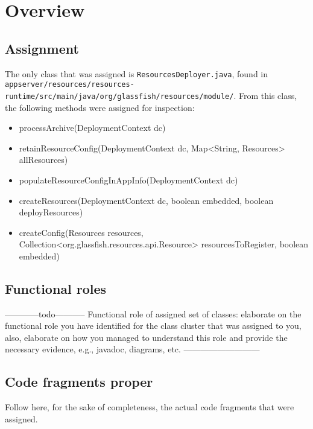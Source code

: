 \chapter{Overview}

\section{Assignment}
The only class that was assigned is \texttt{ResourcesDeployer.java}, found in \texttt{appserver/\-resources/\-resources-runtime/\-src/\-main/\-java/\-org/\-glassfish/\-resources/\-module/}. From this class, the following methods were assigned for inspection:
\begin{itemize}
\item\ttfamily processArchive(DeploymentContext dc)
\item\ttfamily retainResourceConfig(DeploymentContext dc, Map<String, Resources> allResources)
\item\ttfamily populateResourceConfigInAppInfo(DeploymentContext dc)
\item\ttfamily createResources(DeploymentContext dc, boolean embedded, boolean deployResources)
\item\ttfamily createConfig(Resources resources, Collection<org.\-glassfish.\-resources.\-api.\-Resource> resourcesToRegister, boolean embedded)
\end{itemize}

\section{Functional roles}
------------todo-----------
Functional role of assigned set of classes: elaborate on the functional role
you have identified for the class cluster that was assigned to you, also, elaborate
on how you managed to understand this role and provide the necessary
evidence, e.g., javadoc, diagrams, etc.
---------------------------

\section{Code fragments proper}
Follow here, for the sake of completeness, the actual code fragments that were assigned.










